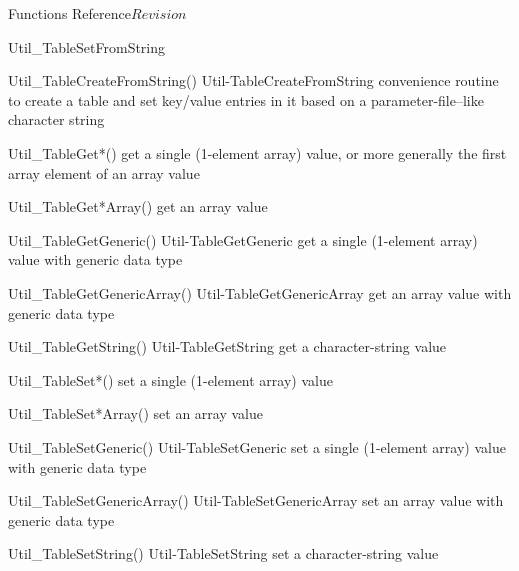 \begin{cactuspart}{ Functions Reference}{}{$Revision$}
\begin{FunctionDescription}{Util\_TableSetFromString}
\begin{SeeAlsoSection}
\begin{SeeAlso2} {Util\_TableCreateFromString()} {Util-TableCreateFromString}
convenience routine to create a table and set key/value entries
in it based on a parameter-file--like character string
\end{SeeAlso2}
\begin{SeeAlso}{Util\_TableGet*()}
get a single (1-element array) value,
or more generally the first array element of an array value
\end{SeeAlso}
\begin{SeeAlso}{Util\_TableGet*Array()}
get an array value
\end{SeeAlso}
\begin{SeeAlso2} {Util\_TableGetGeneric()} {Util-TableGetGeneric}
get a single (1-element array) value with generic data type
\end{SeeAlso2}
\begin{SeeAlso2} {Util\_TableGetGenericArray()} {Util-TableGetGenericArray}
get an array value with generic data type
\end{SeeAlso2}
\begin{SeeAlso2} {Util\_TableGetString()} {Util-TableGetString}
get a character-string value
\end{SeeAlso2}
\begin{SeeAlso}{Util\_TableSet*()}
set a single (1-element array) value
\end{SeeAlso}
\begin{SeeAlso}{Util\_TableSet*Array()}
set an array value
\end{SeeAlso}
\begin{SeeAlso2} {Util\_TableSetGeneric()} {Util-TableSetGeneric}
set a single (1-element array) value with generic data type
\end{SeeAlso2}
\begin{SeeAlso2} {Util\_TableSetGenericArray()} {Util-TableSetGenericArray}
set an array value with generic data type
\end{SeeAlso2}
\begin{SeeAlso2} {Util\_TableSetString()} {Util-TableSetString}
set a character-string value
\end{SeeAlso2}
\end{SeeAlsoSection}


\end{FunctionDescription}
\end{cactuspart}
